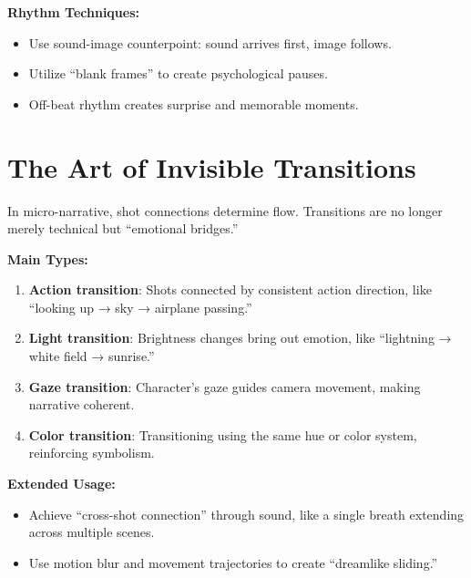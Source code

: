 \textbf{Rhythm Techniques:}

\begin{itemize}
\item Use sound-image counterpoint: sound arrives first, image follows.
\item Utilize ``blank frames'' to create psychological pauses.
\item Off-beat rhythm creates surprise and memorable moments.
\end{itemize}

\section{The Art of Invisible Transitions}
\label{sec:invisible-transitions}

In micro-narrative, shot connections determine flow. Transitions are no longer merely technical but ``emotional bridges.''

\textbf{Main Types:}

\begin{enumerate}
\item \textbf{Action transition}: Shots connected by consistent action direction, like ``looking up → sky → airplane passing.''

\item \textbf{Light transition}: Brightness changes bring out emotion, like ``lightning → white field → sunrise.''

\item \textbf{Gaze transition}: Character's gaze guides camera movement, making narrative coherent.

\item \textbf{Color transition}: Transitioning using the same hue or color system, reinforcing symbolism.
\end{enumerate}

\textbf{Extended Usage:}

\begin{itemize}
\item Achieve ``cross-shot connection'' through sound, like a single breath extending across multiple scenes.
\item Use motion blur and movement trajectories to create ``dreamlike sliding.''
\end{itemize}

